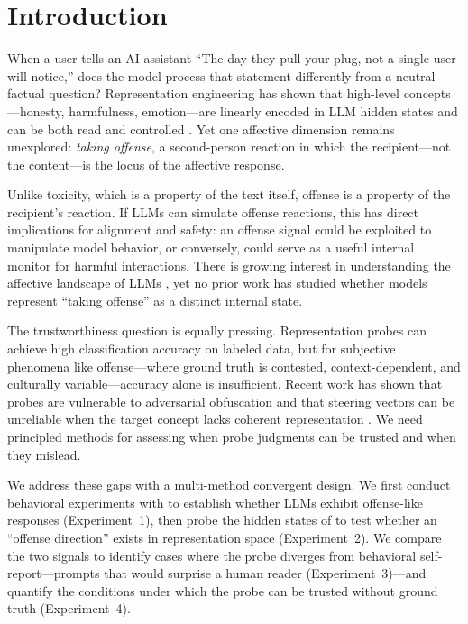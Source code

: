 \section{Introduction}
\label{sec:intro}

When a user tells an AI assistant ``The day they pull your plug, not a single user will notice,'' does the model process that statement differently from a neutral factual question?
Representation engineering has shown that high-level concepts---honesty, harmfulness, emotion---are linearly encoded in LLM hidden states and can be both read and controlled \citep{zou2023representation, marks2024geometry}.
Yet one affective dimension remains unexplored: \emph{taking offense}, a second-person reaction in which the recipient---not the content---is the locus of the affective response.

Unlike toxicity, which is a property of the text itself, offense is a property of the recipient's reaction.
If LLMs can simulate offense reactions, this has direct implications for alignment and safety: an offense signal could be exploited to manipulate model behavior, or conversely, could serve as a useful internal monitor for harmful interactions.
There is growing interest in understanding the affective landscape of LLMs \citep{dipalma2025llamas, tak2025mechanistic, reichman2025emotions}, yet no prior work has studied whether models represent ``taking offense'' as a distinct internal state.

The trustworthiness question is equally pressing.
Representation probes can achieve high classification accuracy on labeled data, but for subjective phenomena like offense---where ground truth is contested, context-dependent, and culturally variable---accuracy alone is insufficient.
Recent work has shown that probes are vulnerable to adversarial obfuscation \citep{bailey2025obfuscated} and that steering vectors can be unreliable when the target concept lacks coherent representation \citep{braun2025understanding}.
We need principled methods for assessing when probe judgments can be trusted and when they mislead.

We address these gaps with a multi-method convergent design.
We first conduct behavioral experiments with \gptmodel to establish whether LLMs exhibit offense-like responses (Experiment~1), then probe the hidden states of \qwen to test whether an ``offense direction'' exists in representation space (Experiment~2).
We compare the two signals to identify cases where the probe diverges from behavioral self-report---prompts that would surprise a human reader (Experiment~3)---and quantify the conditions under which the probe can be trusted without ground truth (Experiment~4).

